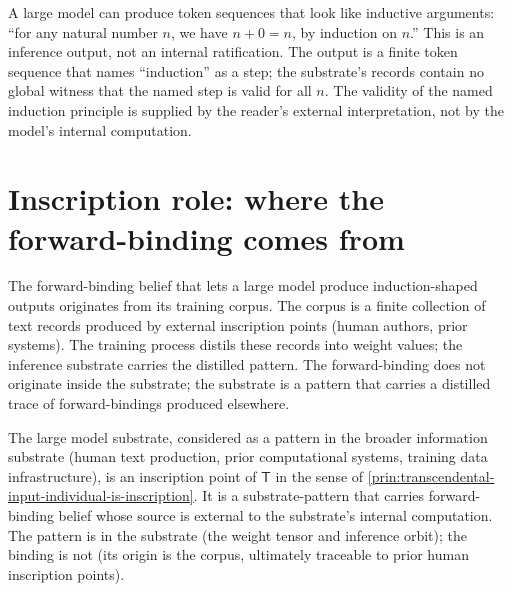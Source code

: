 \begin{remark}
\label{rem:large-model-appearance-of-induction}
A large model can produce token sequences that look like inductive arguments: ``for any natural number $n$, we have $n + 0 = n$, by induction on $n$.'' This is an inference output, not an internal ratification. The output is a finite token sequence that names ``induction'' as a step; the substrate's records contain no global witness that the named step is valid for all $n$. The validity of the named induction principle is supplied by the reader's external interpretation, not by the model's internal computation.
\end{remark}

\section{Inscription role: where the forward-binding comes from}
\label{sec:large-model-inscription-role}

\begin{principle}
\label{prin:large-model-corpus-as-supply}
The forward-binding belief that lets a large model produce induction-shaped outputs originates from its training corpus. The corpus is a finite collection of text records produced by external inscription points (human authors, prior systems). The training process distils these records into weight values; the inference substrate carries the distilled pattern. The forward-binding does not originate inside the substrate; the substrate is a pattern that carries a distilled trace of forward-bindings produced elsewhere.
\end{principle}

\begin{principle}
\label{prin:large-model-as-inscription-point}
The large model substrate, considered as a pattern in the broader information substrate (human text production, prior computational systems, training data infrastructure), is an inscription point of $\mathsf{T}$ in the sense of \autoref{prin:transcendental-input-individual-is-inscription}. It is a substrate-pattern that carries forward-binding belief whose source is external to the substrate's internal computation. The pattern is in the substrate (the weight tensor and inference orbit); the binding is not (its origin is the corpus, ultimately traceable to prior human inscription points).
\end{principle}

